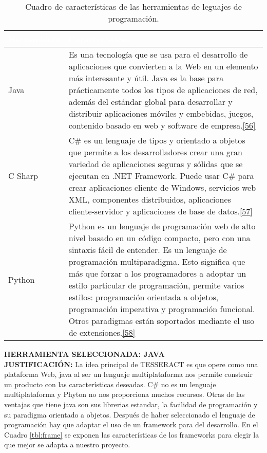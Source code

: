 \begin{table}[H]
	\centering
	\begin{tabular}{|p{3cm}|p{12cm}|}
		\hline
		\rowcolor{black}  \textcolor{white}{\textbf{Herramienta}} & \textcolor{white}{\textbf{Características}}  \\ \hline
		Java &  Es una tecnología que se usa para el desarrollo de aplicaciones que convierten a la Web en un elemento más interesante y útil. Java es la base para prácticamente todos los tipos de aplicaciones de red, además del estándar global para desarrollar y distribuir aplicaciones móviles y embebidas, juegos, contenido basado en web y software de empresa.\hyperlink{b56}{[56]} \\
		\hline
		C Sharp & C\# es un lenguaje de tipos y orientado a objetos que permite a los desarrolladores crear una gran variedad de aplicaciones seguras y sólidas que se ejecutan en .NET Framework. Puede usar C\# para crear aplicaciones cliente de Windows, servicios web XML, componentes distribuidos, aplicaciones cliente-servidor y aplicaciones de base de datos.\hyperlink{b57}{[57]} \\
		\hline
		Python & Python es un lenguaje de programación web de alto nivel basado en un código compacto, pero con una sintaxis fácil de entender. Es un lenguaje de programación multiparadigma. Esto significa que más que forzar a los programadores a adoptar un estilo particular de programación, permite varios estilos: programación orientada a objetos, programación imperativa y programación funcional. Otros paradigmas están soportados mediante el uso de extensiones.\hyperlink{b58}{[58]} \\
		\hline

	\end{tabular}
\caption{Cuadro de características de las herramientas de leguajes de programación.}
\label{tbl:lenguaje}
\end{table}

\textbf {HERRAMIENTA SELECCIONADA: JAVA}\\

\textbf {JUSTIFICACIÓN:} La idea principal de TESSERACT es que opere como una plataforma Web, java al ser un lenguaje multiplataforma nos permite construir un producto con las características deseadas. C\# no es un lenguaje multiplataforma y Phyton no nos proporciona muchos recursos. Otras de las ventajas que tiene java son sus librerias estandar, la facilidad de programación y su paradigma orientado a objetos. 
\newpage
Después de haber seleccionado el lenguaje de programación hay que adaptar el uso de un framework para del desarrollo. En el Cuadro \ref{tbl:frame} se exponen las características de los frameworks para elegir la que mejor se adapta a nuestro proyecto.

